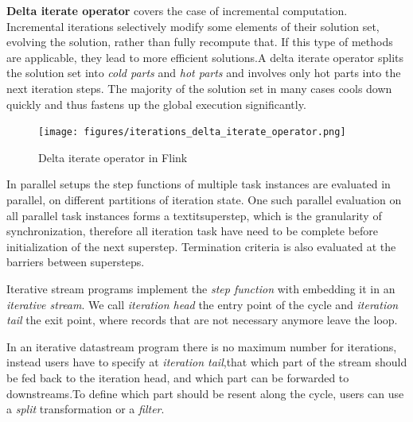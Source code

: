 \textbf{Delta iterate operator} covers the case of incremental computation. Incremental iterations selectively modify some elements of their solution set, evolving the solution, rather than fully recompute that. If this type of methods are applicable, they lead to more efficient solutions.A delta iterate operator splits the solution set into \textit{cold parts} and \textit{hot parts} and involves only hot parts into the next iteration steps. The majority of the solution set in many cases cools down quickly and thus fastens up the global execution significantly.
\begin{figure}[!ht]
  \centering    
      \texttt{[image: figures/iterations\_delta\_iterate\_operator.png]}
  \caption{Delta iterate operator in Flink\cite{flink_doc_iteration}}
  \label{fig:iterations_iterate_operator}
\end{figure}
In parallel setups the step functions of multiple task instances are evaluated in parallel, on different partitions of iteration state. One such parallel evaluation on all parallel task instances forms a textit{superstep}, which is the granularity of synchronization, therefore all iteration task have need to be complete before initialization of the next superstep. Termination criteria is also evaluated at the barriers between supersteps.	
\cite{flink_doc_iteration}

Iterative stream programs implement the \textit{step function} with embedding it in an \textit{iterative stream}. We call \textit{iteration head} the entry point of the cycle and \textit{iteration tail} the exit point, where records that are not necessary anymore leave the loop.

In an iterative datastream program there is no maximum number for iterations, instead users have to specify at \textit{iteration tail},that which part of the stream should be fed back to the iteration head, and which part can be forwarded to downstreams.To define which part should be resent along the cycle,  users can use a \textit{split} transformation or a \textit{filter}.

